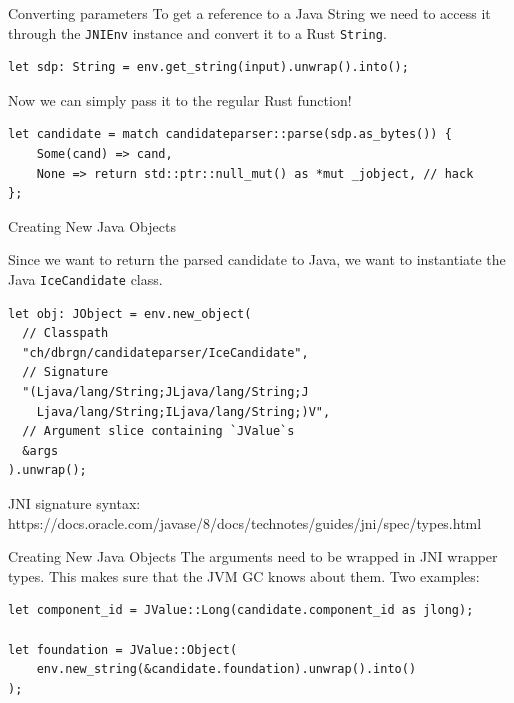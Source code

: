 \documentclass[aspectratio=1610,14pt,t]{beamer}
\begin{document}
\begin{frame}[c,fragile]{Converting parameters}
  To get a reference to a Java String we need to access it through the
  \texttt{JNIEnv} instance and convert it to a Rust \texttt{String}.

  \begin{verbatim}
let sdp: String = env.get_string(input).unwrap().into();
  \end{verbatim}

  Now we can simply pass it to the regular Rust function!

  \begin{verbatim}
let candidate = match candidateparser::parse(sdp.as_bytes()) {
    Some(cand) => cand,
    None => return std::ptr::null_mut() as *mut _jobject, // hack
};
  \end{verbatim}
\end{frame}

\begin{frame}[c,fragile]{Creating New Java Objects}

  Since we want to return the parsed candidate to Java, we want to instantiate
  the Java \texttt{IceCandidate} class.

  \begin{verbatim}
let obj: JObject = env.new_object(
  // Classpath
  "ch/dbrgn/candidateparser/IceCandidate",
  // Signature
  "(Ljava/lang/String;JLjava/lang/String;J
    Ljava/lang/String;ILjava/lang/String;)V",
  // Argument slice containing `JValue`s
  &args
).unwrap();
  \end{verbatim}

  JNI signature syntax:\\
  {\footnotesize https://docs.oracle.com/javase/8/docs/technotes/guides/jni/spec/types.html}

\end{frame}

\begin{frame}[c,fragile]{Creating New Java Objects}
  The arguments need to be wrapped in JNI wrapper types. This makes sure that
  the JVM GC knows about them. Two examples:

  \begin{verbatim}
let component_id = JValue::Long(candidate.component_id as jlong);

let foundation = JValue::Object(
    env.new_string(&candidate.foundation).unwrap().into()
);
  \end{verbatim}
\end{frame}
\end{document}
